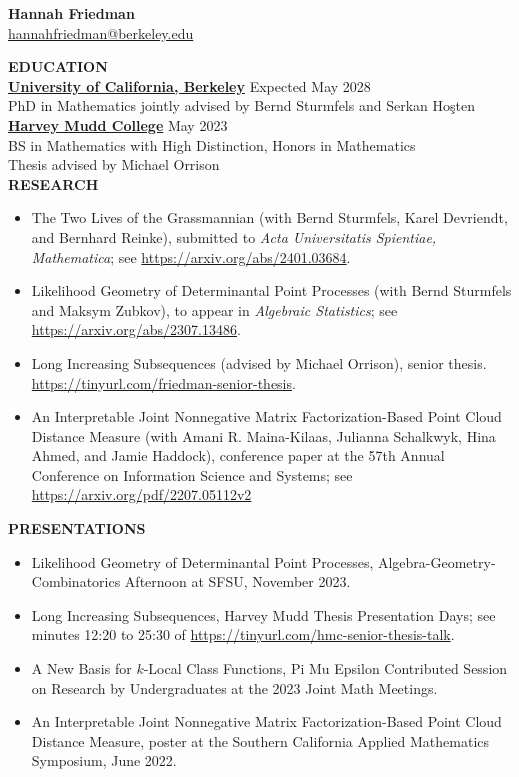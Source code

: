 \documentclass[11pt]{article}
\newcommand{\hdr}[1]{\textcolor{blue(ryb)}{\textbf{#1}}}
\begin{document}
\begin{center}
\hdr{\Large{Hannah Friedman}}\\
\url{hannahfriedman@berkeley.edu}\\
\end{center}
\medskip
\raggedright
\hdr{EDUCATION}\\
\textbf{\underline{University of California, Berkeley}} \hfill Expected May 2028\\
PhD in Mathematics jointly advised by Bernd Sturmfels and Serkan Ho\c{s}ten\\
\textbf{\underline{Harvey Mudd College}} \hfill May 2023\\
BS in Mathematics with High Distinction, Honors in Mathematics\\
Thesis advised by Michael Orrison\\
\medskip
\hdr{RESEARCH}\\
\begin{itemize}
\item The Two Lives of the Grassmannian (with Bernd Sturmfels, Karel Devriendt, and Bernhard Reinke), submitted to \textit{Acta Universitatis Spientiae, Mathematica}; see  \url{https://arxiv.org/abs/2401.03684}.
\item Likelihood Geometry of Determinantal Point Processes (with Bernd Sturmfels and Maksym Zubkov), to appear in \emph{Algebraic Statistics}; see  \url{https://arxiv.org/abs/2307.13486}.
\item Long Increasing Subsequences (advised by Michael Orrison), senior thesis.  \url{https://tinyurl.com/friedman-senior-thesis}.
\item An Interpretable Joint Nonnegative Matrix Factorization-Based Point Cloud Distance Measure (with Amani R. Maina-Kilaas, Julianna Schalkwyk, Hina Ahmed, and Jamie Haddock), conference paper at the 57th Annual Conference on Information Science and Systems; see \url{https://arxiv.org/pdf/2207.05112v2}
\end{itemize}
\hdr{PRESENTATIONS}\\
\begin{itemize}
\item Likelihood Geometry of Determinantal Point Processes, Algebra-Geometry-Combinatorics Afternoon at SFSU, November 2023.
\item Long Increasing Subsequences, Harvey Mudd Thesis Presentation Days; see minutes 12:20 to 25:30 of \url{https://tinyurl.com/hmc-senior-thesis-talk}.
\item A New Basis for $k$-Local Class Functions, Pi Mu Epsilon Contributed Session on Research by Undergraduates at the 2023 Joint Math Meetings.
\item An Interpretable Joint Nonnegative Matrix Factorization-Based Point Cloud Distance Measure, poster at the Southern California Applied Mathematics Symposium, June 2022.
\end{itemize}
\end{document}
